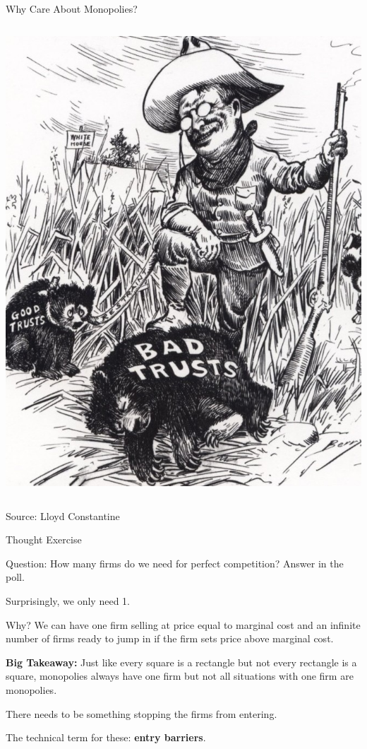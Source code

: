 \documentclass[aspectratio=169]{beamer}
\newenvironment{wideitemize}{\itemize\addtolength{\itemsep}{10pt}}{\enditemize}
\begin{document}
\begin{frame}{Why Care About Monopolies?}
\begin{columns}[T]
\begin{column}{.34\textwidth}
{  \includegraphics{cartoon-Theodore-Roosevelt-trust-buster-e1560544846616.jpg}
  
}
\end{column}%
\end{columns}

  \hfill Source: Lloyd Constantine
\end{frame}

\begin{frame}{Thought Exercise}
    \begin{wideitemize}
            \item Question: How many firms do we need for perfect competition? Answer in the poll.
            \pause \item Surprisingly, we only need 1.
            \pause\item Why? We can have one firm selling at price equal to marginal cost and an infinite number of firms ready to jump in if the firm sets price above marginal cost.
            \pause\item \textbf{Big Takeaway:} Just like every square is a rectangle but not every rectangle is a square, monopolies always have one firm but not all situations with one firm are monopolies.
            \pause\item There needs to be something stopping the firms from entering.
            \pause\item The technical term for these: \textbf{entry barriers}.
    \end{wideitemize}
\end{frame}
\end{document}
